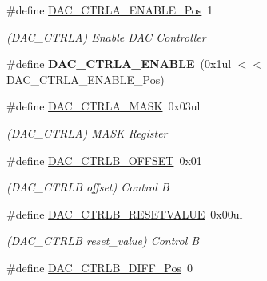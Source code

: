 \begin{DoxyCompactItemize}
\item 
\hypertarget{group___s_a_m_l21___d_a_c_gafa6e69ab386a0acc15ec18b0584091f9}{}\#define \hyperlink{group___s_a_m_l21___d_a_c_gafa6e69ab386a0acc15ec18b0584091f9}{D\+A\+C\+\_\+\+C\+T\+R\+L\+A\+\_\+\+E\+N\+A\+B\+L\+E\+\_\+\+Pos}~1\label{group___s_a_m_l21___d_a_c_gafa6e69ab386a0acc15ec18b0584091f9}

\begin{DoxyCompactList}\small\item\em (D\+A\+C\+\_\+\+C\+T\+R\+L\+A) Enable D\+A\+C Controller \end{DoxyCompactList}\item 
\hypertarget{group___s_a_m_l21___d_a_c_gabdbf590aa240a8a85a49f13e27872353}{}\#define {\bfseries D\+A\+C\+\_\+\+C\+T\+R\+L\+A\+\_\+\+E\+N\+A\+B\+L\+E}~(0x1ul $<$$<$ D\+A\+C\+\_\+\+C\+T\+R\+L\+A\+\_\+\+E\+N\+A\+B\+L\+E\+\_\+\+Pos)\label{group___s_a_m_l21___d_a_c_gabdbf590aa240a8a85a49f13e27872353}

\item 
\hypertarget{group___s_a_m_l21___d_a_c_ga3194764eec2b07936137bbd3afbde5d2}{}\#define \hyperlink{group___s_a_m_l21___d_a_c_ga3194764eec2b07936137bbd3afbde5d2}{D\+A\+C\+\_\+\+C\+T\+R\+L\+A\+\_\+\+M\+A\+S\+K}~0x03ul\label{group___s_a_m_l21___d_a_c_ga3194764eec2b07936137bbd3afbde5d2}

\begin{DoxyCompactList}\small\item\em (D\+A\+C\+\_\+\+C\+T\+R\+L\+A) M\+A\+S\+K Register \end{DoxyCompactList}\item 
\hypertarget{group___s_a_m_l21___d_a_c_ga77355709810c770d457b0206b73e12c2}{}\#define \hyperlink{group___s_a_m_l21___d_a_c_ga77355709810c770d457b0206b73e12c2}{D\+A\+C\+\_\+\+C\+T\+R\+L\+B\+\_\+\+O\+F\+F\+S\+E\+T}~0x01\label{group___s_a_m_l21___d_a_c_ga77355709810c770d457b0206b73e12c2}

\begin{DoxyCompactList}\small\item\em (D\+A\+C\+\_\+\+C\+T\+R\+L\+B offset) Control B \end{DoxyCompactList}\item 
\hypertarget{group___s_a_m_l21___d_a_c_gac2138055bf74ac2fccda007458cdca1d}{}\#define \hyperlink{group___s_a_m_l21___d_a_c_gac2138055bf74ac2fccda007458cdca1d}{D\+A\+C\+\_\+\+C\+T\+R\+L\+B\+\_\+\+R\+E\+S\+E\+T\+V\+A\+L\+U\+E}~0x00ul\label{group___s_a_m_l21___d_a_c_gac2138055bf74ac2fccda007458cdca1d}

\begin{DoxyCompactList}\small\item\em (D\+A\+C\+\_\+\+C\+T\+R\+L\+B reset\+\_\+value) Control B \end{DoxyCompactList}\item 
\hypertarget{group___s_a_m_l21___d_a_c_gabbf790da9956c2dd5f02756f9187989c}{}\#define \hyperlink{group___s_a_m_l21___d_a_c_gabbf790da9956c2dd5f02756f9187989c}{D\+A\+C\+\_\+\+C\+T\+R\+L\+B\+\_\+\+D\+I\+F\+F\+\_\+\+Pos}~0\label{group___s_a_m_l21___d_a_c_gabbf790da9956c2dd5f02756f9187989c}


\end{DoxyCompactItemize}
